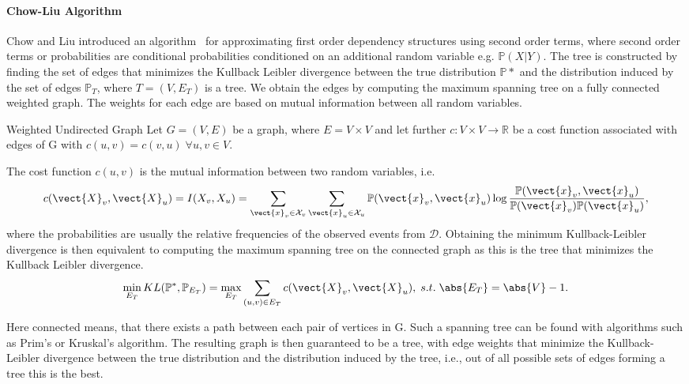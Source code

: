 \paragraph*{Chow-Liu Algorithm}
Chow and Liu introduced an algorithm~\cite{chow1968approximating} for approximating first order dependency structures using second order terms, where second order terms or probabilities are conditional probabilities conditioned on an additional random variable e.g. $\mathbb{P}(X \lvert Y)$.
The tree is constructed by finding the set of edges that minimizes the Kullback Leibler divergence between the true distribution $\mathbb{P}*$ and the distribution induced by the set of edges $\mathbb{P}_T$, where $T=(V, E_T)$ is a tree.
We obtain the edges by computing the maximum spanning tree on a fully connected weighted graph.
The weights for each edge are based on mutual information between all random variables.

\begin{definition}{Weighted Undirected Graph}
    Let $G=(V,E)$ be a graph, where $E = V \times V$ and let further $c: V \times V \rightarrow \mathbb{R}$ be a cost function associated with edges of G with $c(u,v) = c(v,u) \; \forall u,v \in V$.
\end{definition}

The cost function $c(u,v)$ is the mutual information between two random variables, i.e. 
\begin{equation}
    c(\vect{X}_v, \vect{X}_u) = I(X_v, X_u) = \sum_{\vect{x}_v \in \mathcal{X}_v} \sum_{\vect{x}_u \in \mathcal{X}_u} \mathbb{P}(\vect{x}_v,\vect{x}_u) \log \frac{\mathbb{P}(\vect{x}_v,\vect{x}_u) }{\mathbb{P}(\vect{x}_v)  \mathbb{P}(\vect{x}_u)},
\end{equation}
where the probabilities are usually the relative frequencies of the observed events from $\mathcal{D}$.
Obtaining the minimum Kullback-Leibler divergence is then equivalent to computing the maximum spanning tree on the connected graph as this is the tree that minimizes the Kullback Leibler divergence.
\begin{equation}
    \min_{E_T} KL(\mathbb{P}^*, \mathbb{P}_{E_T}) = \max_{E_T} \sum_{(u,v) \in E_T} c(\vect{X}_v, \vect{X}_u), \; s.t. \; \abs{E_T} = \abs{V}-1 .
\end{equation}



Here connected means, that there exists a path between each pair of vertices in G. 
Such a spanning tree can be found with algorithms such as Prim's or Kruskal's algorithm.
The resulting graph is then guaranteed to be a tree, with edge weights that minimize the Kullback-Leibler divergence between the true distribution and the distribution induced by the tree, i.e., out of all possible sets of edges forming a tree this is the best.

